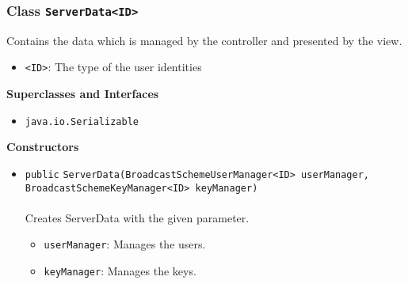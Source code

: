 \subsubsection{Class \lstinline|ServerData<ID>|}
Contains the data which is managed by the controller and presented by the view. \\
\noindent\begin{minipage}[t]{5cm}
\vspace{0.3em}
\hspace*{2em}
\vspace{0.3em}
\end{minipage}

\begin{itemize}
\item \lstinline|<ID>|: The type of the user identities
\end{itemize}


\textbf{\sffamily Superclasses and Interfaces}
\begin{itemize}
\item \lstinline|java.io.Serializable|
\end{itemize}


\textbf{\sffamily Constructors}
\begin{itemize}
\item \lstinline|public| \lstinline|ServerData|\lstinline|(BroadcastSchemeUserManager<ID> userManager, BroadcastSchemeKeyManager<ID> keyManager)|\\ \\[-0.6em]
Creates ServerData with the given parameter.
\begin{itemize}
\item \lstinline|userManager|: Manages the users.
\item \lstinline|keyManager|: Manages the keys.
\end{itemize}



\end{itemize}


